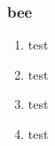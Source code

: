\begin{frame}
  \frametitle{bee}
	 \begin{enumerate}
	    \item test
	    \item test
	    \item test
	    \item test
	  \end{enumerate}
\end{frame}